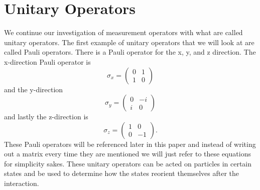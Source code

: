 \documentclass[twocolumn]{article}
\begin{document}
\section*{Unitary Operators}
We continue our investigation of measurement operators with what are called unitary operators. The first example of unitary operators that we will look at are called Pauli operators. There is a Pauli operator for the x, y, and z direction. The x-direction Pauli operator is
\begin{equation}
\sigma_x=
\begin{pmatrix}
0 & 1 \\
1 & 0
\end{pmatrix}
\end{equation}
and the y-direction
\begin{equation}
\sigma_y=
\begin{pmatrix}
0 & -i \\
i & 0
\end{pmatrix}
\end{equation}
and lastly the z-direction is
\begin{equation}
\sigma_z=
\begin{pmatrix}
1 & 0 \\
0 & -1
\end{pmatrix}.
\end{equation}
These Pauli operators will be referenced later in this paper and instead of writing out a matrix every time they are mentioned we will just refer to these equations for simplicity sakes. These unitary operators can be acted on particles in certain states and be used to determine how the states reorient themselves after the interaction.
\end{document}
